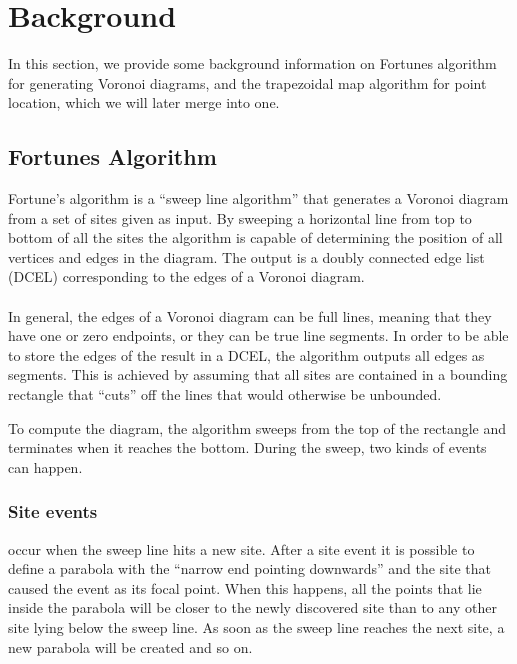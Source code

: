 \section{Background}
\label{background}

In this section, we provide some background information on Fortunes algorithm for generating Voronoi diagrams, and the trapezoidal map algorithm for point location, which we will later merge into one.

\subsection{Fortunes Algorithm}
Fortune’s algorithm is a “sweep line algorithm” that generates a Voronoi diagram from a set of sites given as input. By sweeping a horizontal line from top to bottom of all the sites the algorithm is capable of determining the position of all vertices and edges in the diagram. The output is a doubly connected edge list (DCEL) corresponding to the edges of a Voronoi diagram.

\paragraph{}
In general, the edges of a Voronoi diagram can be full lines, meaning that they have one or zero endpoints, or they can be true line segments. In order to be able to store the edges of the result in a DCEL, the algorithm outputs all edges as segments. This is achieved by assuming that all sites are contained in a bounding rectangle that “cuts” off the lines that would otherwise be unbounded. 

To compute the diagram, the algorithm sweeps from the top of the rectangle and terminates when it reaches the bottom. During the sweep, two kinds of events can happen. 

\subsubsection{Site events}
occur when the sweep line hits a new site. After a site event it is possible to define a parabola with the “narrow end pointing downwards” and the site that caused the event as its focal point. When this happens, all the points that lie inside the parabola will be closer to the newly discovered site than to any other site lying below the sweep line. As soon as the sweep line reaches the next site, a new parabola will be created and so on.

